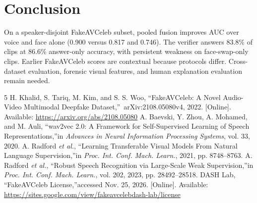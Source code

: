 \documentclass[conference]{IEEEtran}
\begin{document}
\section{Conclusion}
On a speaker-disjoint FakeAVCeleb subset, pooled fusion improves AUC over voice and face alone (0.900 versus 0.817 and 0.746). The verifier answers 83.8\% of clips at 86.6\% answer-only accuracy, with persistent weakness on face-swap-only clips. Earlier FakeAVCeleb scores are contextual because protocols differ. Cross-dataset evaluation, forensic visual features, and human explanation evaluation remain needed.
\begin{thebibliography}{5}
 H. Khalid, S. Tariq, M. Kim, and S. S. Woo, \textquotedblleft FakeAVCeleb: A Novel Audio-Video Multimodal Deepfake Dataset,\textquotedblright\ arXiv:2108.05080v4, 2022. [Online]. Available: \url{https://arxiv.org/abs/2108.05080}
 A. Baevski, Y. Zhou, A. Mohamed, and M. Auli, \textquotedblleft wav2vec 2.0: A Framework for Self-Supervised Learning of Speech Representations,\textquotedblright in \emph{Advances in Neural Information Processing Systems}, vol. 33, 2020.
 A. Radford \emph{et al.}, \textquotedblleft Learning Transferable Visual Models From Natural Language Supervision,\textquotedblright in \emph{Proc. Int. Conf. Mach. Learn.}, 2021, pp. 8748--8763.
 A. Radford \emph{et al.}, \textquotedblleft Robust Speech Recognition via Large-Scale Weak Supervision,\textquotedblright in \emph{Proc. Int. Conf. Mach. Learn.}, vol. 202, 2023, pp. 28492--28518.
 DASH Lab, \textquotedblleft FakeAVCeleb License,\textquotedblright accessed Nov. 25, 2026. [Online]. Available: \url{https://sites.google.com/view/fakeavcelebdash-lab/license}
\end{thebibliography}
\end{document}
